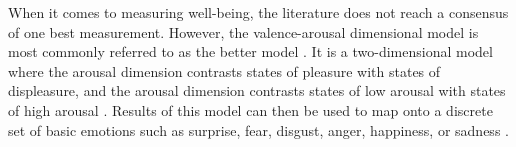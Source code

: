 When it comes to measuring well-being, the literature does not reach a consensus of one best measurement. However, the valence-arousal dimensional model is most commonly referred to as the better model \autocite{russell1980circumplex, mauss2009measures}. It is a two-dimensional model where the arousal dimension contrasts states of pleasure with states of displeasure, and the arousal dimension contrasts states of low arousal with states of high arousal \autocite{mauss2009measures}. Results of this model can then be used to map onto a discrete set of basic emotions such as surprise, fear, disgust, anger, happiness, or sadness \autocite{brave2007emotion}.